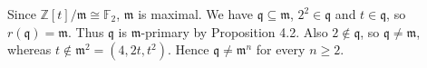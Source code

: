 Since $\mathbb{Z}[t]/\mathfrak{m}\cong\mathbb{F}_2$, $\mathfrak{m}$ is maximal. We have $\mathfrak{q}\subseteq\mathfrak{m}$, $2^2\in\mathfrak{q}$ and $t\in\mathfrak{q}$, so $r(\mathfrak{q})=\mathfrak{m}$. Thus $\mathfrak{q}$ is $\mathfrak{m}$-primary by Proposition 4.2. Also $2\notin\mathfrak{q}$, so $\mathfrak{q}\ne\mathfrak{m}$, whereas $t\notin\mathfrak{m}^2=(4,2t,t^2)$. Hence $\mathfrak{q}\ne\mathfrak{m}^n$ for every $n\ge2$.
